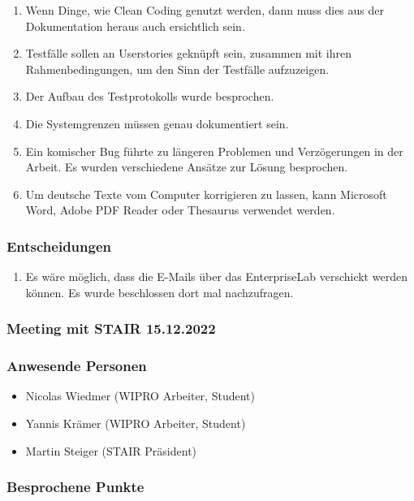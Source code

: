 \documentclass[a4paper, table]{article}
\begin{document}
\begin{enumerate}
    \item Wenn Dinge, wie Clean Coding genutzt werden, dann muss dies aus der Dokumentation heraus auch ersichtlich sein.
    \item Testfälle sollen an Userstories geknüpft sein, zusammen mit ihren Rahmenbedingungen, um den Sinn der Testfälle aufzuzeigen.
    \item Der Aufbau des Testprotokolls wurde besprochen.
    \item Die Systemgrenzen müssen genau dokumentiert sein.
    \item Ein komischer Bug führte zu längeren Problemen und Verzögerungen in der Arbeit. Es wurden verschiedene Ansätze zur Lösung besprochen.
    \item Um deutsche Texte vom Computer korrigieren zu lassen, kann Microsoft Word, Adobe PDF Reader oder Thesaurus verwendet werden.
\end{enumerate}

\subsubsection*{Entscheidungen}

\begin{enumerate}
    \item Es wäre möglich, dass die E-Mails über das EnterpriseLab verschickt werden können. Es wurde beschlossen dort mal nachzufragen.
\end{enumerate}

\newpage
\subsubsection{Meeting mit STAIR 15.12.2022}

\subsubsection*{Anwesende Personen}

\begin{itemize}
    \item Nicolas Wiedmer (WIPRO Arbeiter, Student)
    \item Yannis Krämer (WIPRO Arbeiter, Student)
    \item Martin Steiger (STAIR Präsident)
\end{itemize}

\subsubsection*{Besprochene Punkte}
\end{document}
